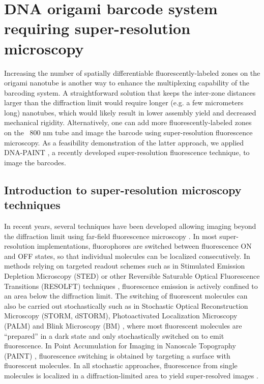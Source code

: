 \section{DNA origami barcode system requiring super-resolution microscopy}
Increasing the number of spatially differentiable fluorescently-labeled zones on 
the origami nanotube is another way to enhance the multiplexing capability of the 
barcoding system. A straightforward solution that keeps the inter-zone distances larger 
than the diffraction limit would require longer (e.g. a few micrometers long) nanotubes, 
which would likely result in lower assembly yield and decreased mechanical rigidity. 
Alternatively, one can add more fluorescently-labeled zones on the ~800 nm tube and image the barcode using super-resolution 
fluorescence microscopy. As a feasibility demonstration of the latter approach, we 
applied DNA-PAINT \citep{jungmann_single-molecule_2010}, a recently developed super-resolution fluorescence technique, to 
image the barcodes. 

\subsection{Introduction to super-resolution microscopy techniques}
In recent years, several techniques have been developed allowing imaging beyond the diffraction limit using far-field fluorescence microscopy \citep{hell_far-field_2007,hell_microscopy_2009,huang_breaking_2010,vogelsang_make_2010,walter_-it-yourself_2008}. 
In most super-resolution implementations, fluorophores are switched between 
fluorescence ON and OFF states, so that individual molecules can be localized 
consecutively. In methods relying on targeted readout schemes such as in Stimulated 
Emission Depletion Microscopy  (STED) \citep{hell_breaking_1994} or other Reversible Saturable Optical 
Fluorescence Transitions  (RESOLFT) techniques \citep{hell_far-field_2007}, fluorescence emission is actively 
confined to an area below the diffraction limit. The switching of fluorescent molecules 
can also be carried out stochastically such as in Stochastic Optical Reconstruction 
Microscopy \citep{heilemann_subdiffraction-resolution_2008,rust_sub-diffraction-limit_2006} (STORM, dSTORM), Photoactivated Localization Microscopy \citep{betzig_imaging_2006}
(PALM) and Blink Microscopy (BM) \citep{steinhauer_superresolution_2008}, where most fluorescent molecules are 
“prepared” in a dark state and only stochastically switched on to emit fluorescence. In 
Point Accumulation for Imaging in Nanoscale Topography (PAINT) \citep{sharonov_wide-field_2006}, fluorescence 
switching is obtained by targeting a surface with fluorescent molecules. In all stochastic 
approaches, fluorescence from single molecules is localized  in a diffraction-limited 
area to yield super-resolved images \citep{yildiz_myosin_2003,yildiz_kinesin_2004}.

